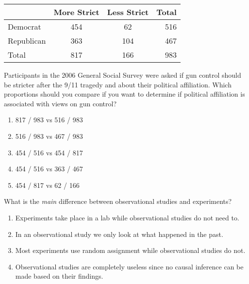 \begin{frame}
\begin{center}
\begin{tabular}{|l|cc|r|}
    \hline
    & More Strict & Less Strict & Total \\
    \hline\hline
    Democrat & 454 & 62 & 516 \\
    Republican & 363 & 104 & 467 \\
    \hline\hline
    Total & 817 & 166 & 983 \\
    \hline
\end{tabular}%
\end{center}
\begin{clicker}{Participants in the 2006 General Social Survey were asked if gun control should be stricter after the 9/11 tragedy and about their political affiliation.  Which proportions should you compare if you want to determine if political affiliation is associated with views on gun control?}
\begin{enumerate}
    \item
    817 / 983 vs 516 / 983
    \item
    516 / 983 vs 467 / 983
    \item
    454 / 516 vs 454 / 817
    \item
    454 / 516 vs 363 / 467
    \item
    454 / 817 vs 62 / 166
\end{enumerate}
\end{clicker}
\end{frame}

\begin{frame}
\begin{clicker}{What is the \emph{main} difference between observational studies and experiments?}
\begin{enumerate}
    \item
    Experiments take place in a lab while observational studies do not need to.
    \item
    In an observational study we only look at what happened in the past.
    \item
    Most experiments use random assignment while observational studies do not.
    \item
    Observational studies are completely useless since no causal inference can be made based on their findings.
\end{enumerate}
\end{clicker}
\end{frame}


